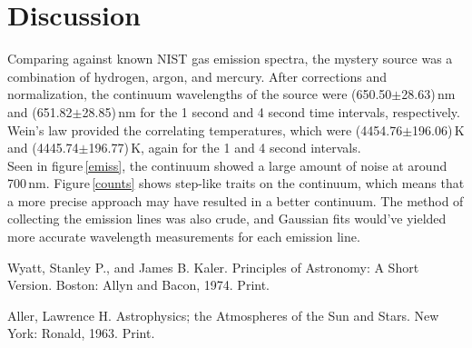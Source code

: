 \documentclass[twocolumn]{aastex6}
\begin{document}
\section{Discussion}

Comparing against known NIST gas emission spectra, the mystery source was a combination of hydrogen, argon, and mercury. After corrections and normalization, the continuum wavelengths of the source were (650.50$\pm$28.63)\,nm and (651.82$\pm$28.85)\,nm for the 1 second and 4 second time intervals, respectively. Wein's law provided the correlating temperatures, which were (4454.76$\pm$196.06)\,K and (4445.74$\pm$196.77)\,K, again for the 1 and 4 second intervals.
\\
\indent Seen in figure\,\ref{emiss}, the continuum showed a large amount of noise at around 700\,nm. Figure\,\ref{counts} shows step-like traits on the continuum, which means that a more precise approach may have resulted in a better continuum. The method of collecting the emission lines was also crude, and Gaussian fits would've yielded more accurate wavelength measurements for each emission line. 





\vspace{5mm}

\begin{thebibliography}{}

Wyatt, Stanley P., and James B. Kaler. Principles of Astronomy: A Short Version. Boston: Allyn and Bacon, 1974. Print.


Aller, Lawrence H. Astrophysics; the Atmospheres of the Sun and Stars. New York: Ronald, 1963. Print.



\end{thebibliography}
\end{document}
